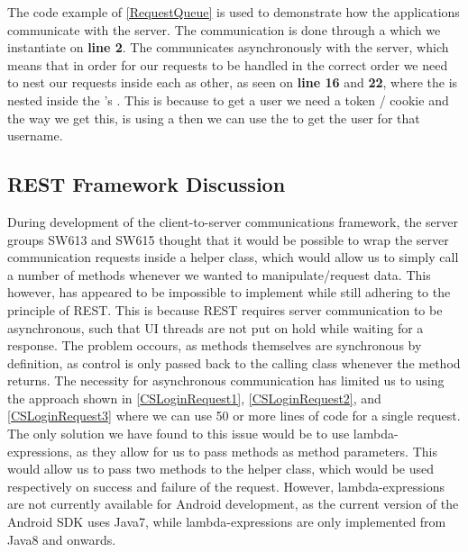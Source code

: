 The code example of \autoref{RequestQueue} is used to demonstrate how the
applications communicate with the server. The communication is done through a
 which we instantiate on \textbf{line 2}. The
 communicates asynchronously with the server, which means
that in order for our requests to be handled in the correct order we need to
nest our requests inside each as other, as seen on \textbf{line 16} and
\textbf{22}, where the  is nested inside the
's . This is because to get a user we need
a token / cookie and the way we get this, is using a  then
we can use the  to get the user for that username.

\subsection{REST Framework Discussion}
\nl
{}\nl
During development of the client-to-server communications framework, the server
groups SW613 and SW615 thought that it would be possible to wrap the server
communication requests inside a helper class, which would allow us to simply
call a number of methods whenever we wanted to manipulate/request data. This
however, has appeared to be impossible to implement while still adhering to the
principle of REST. This is because REST requires server communication to be
asynchronous, such that UI threads are not put on hold while waiting for a
response. The problem occours, as methods themselves are synchronous by
definition, as control is only passed back to the calling class whenever the
method returns. The necessity for asynchronous communication has limited us to
using the approach shown in \autoref{CSLoginRequest1},
\autoref{CSLoginRequest2}, and \autoref{CSLoginRequest3} where we can use 50 or
more lines of code for a single request. The only solution we have found to this
issue would be to use lambda-expressions, as they allow for us to pass methods
as method parameters.
This would allow us to pass two methods to the helper class, which would be used
respectively on success and failure of the request. However, lambda-expressions
are not currently available for Android development, as the current version of
the Android SDK uses Java7, while lambda-expressions are only implemented from
Java8 and onwards.













